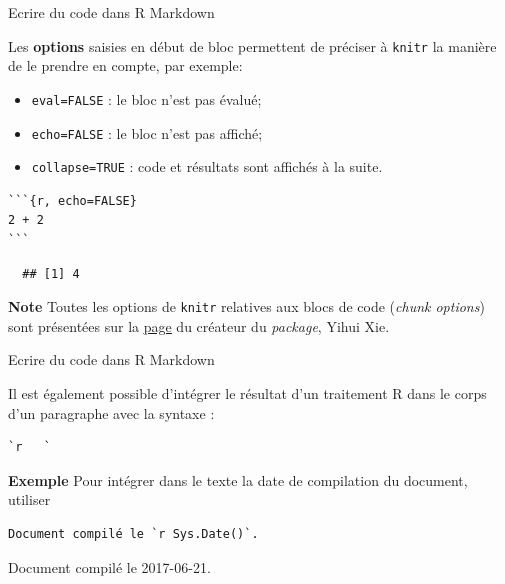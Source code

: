 \documentclass[12pt,handout,ignorenonframetext,]{beamer}
\providecommand{\tightlist}{%
\setlength{\itemsep}{0pt}\setlength{\parskip}{0pt}}
\begin{document}
\begin{frame}[fragile]{Ecrire du code dans R Markdown}

Les \textbf{options} saisies en début de bloc permettent de préciser à
\texttt{knitr} la manière de le prendre en compte, par exemple:

\begin{itemize}
\tightlist
\item
  \texttt{eval=FALSE} : le bloc n'est pas évalué;
\item
  \texttt{echo=FALSE} : le bloc n'est pas affiché;
\item
  \texttt{collapse=TRUE} : code et résultats sont affichés à la suite.
\end{itemize}

\pause 

\begin{verbatim}
```{r, echo=FALSE}
2 + 2
```
\end{verbatim}

\begin{verbatim}
  ## [1] 4
\end{verbatim}

\pause 

\textbf{Note} Toutes les options de \texttt{knitr} relatives aux blocs
de code (\emph{chunk options}) sont présentées sur la
\href{http://yihui.name/knitr/options/}{\underline{page}} du créateur du
\emph{package}, Yihui Xie.

\end{frame}

\begin{frame}[fragile]{Ecrire du code dans R Markdown}

Il est également possible d'intégrer le résultat d'un traitement R dans
le corps d'un paragraphe avec la syntaxe :

\begin{verbatim}
`r   `
\end{verbatim}

\pause 

\textbf{Exemple} Pour intégrer dans le texte la date de compilation du
document, utiliser

\begin{verbatim}
Document compilé le `r Sys.Date()`.
\end{verbatim}

\pause Document compilé le 2017-06-21.

\end{frame}
\end{document}

